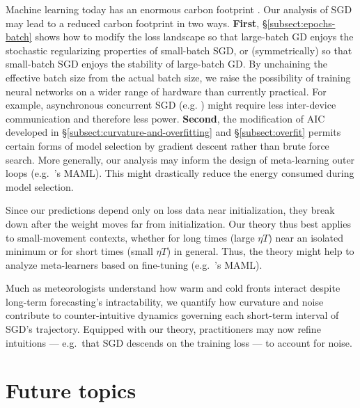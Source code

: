 \documentclass[openany, notitlepage, justified]{tufte-book}
\theoremstyle{plain}
\theoremstyle{definition}
\begin{document}

    Machine learning today has an enormous carbon footprint \citep{st19}.  Our
    analysis of SGD may lead to a reduced carbon footprint in two ways. 
    \textbf{First}, \S\ref{subsect:epochs-batch} shows how to modify the loss
    landscape so that large-batch GD enjoys the stochastic regularizing
    properties of small-batch SGD, or (symmetrically) so that small-batch SGD
    enjoys the stability of large-batch GD.  By unchaining the effective batch
    size from the actual batch size, we raise the possibility of training
    neural networks on a wider range of hardware than currently practical.  For
    example, asynchronous concurrent SGD (e.g. \citep{ni11}) might require less
    inter-device communication and therefore less power.
    \textbf{Second}, the modification of AIC developed in
    \S\ref{subsect:curvature-and-overfitting} and \S\ref{subsect:overfit}
    permits certain forms of model selection by gradient descent rather than
    brute force search.  More generally, our analysis may inform the design of
    meta-learning outer loops (e.g.\ \citep{fi17}'s MAML).  This might
    drastically reduce the energy consumed during model selection.



    Since our predictions depend only on loss data near initialization, they
    break down after the weight moves far from initialization.  Our theory thus
    best applies to small-movement contexts, whether for long times (large
    $\eta T$) near an isolated minimum or for short times (small $\eta T$) in
    general.  Thus, the theory might help to analyze meta-learners based on
    fine-tuning (e.g.\ \citep{fi17}'s MAML).

    Much as meteorologists understand how warm and cold fronts interact despite
    long-term forecasting's intractability, we quantify how curvature and noise
    contribute to counter-intuitive dynamics governing each short-term interval
    of SGD's trajectory.  Equipped with our theory, practitioners may now
    refine intuitions --- e.g.\ that SGD descends on the training loss --- to
    account for noise.

    \section{Future topics}                                      \label{appendix:future}
\end{document}
